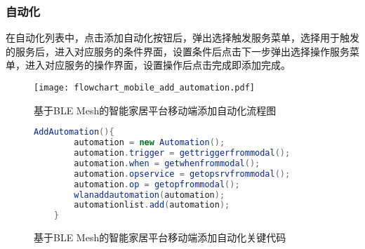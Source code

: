 \subsubsection{自动化}
在自动化列表中，点击添加自动化按钮后，弹出选择触发服务菜单，选择用于触发的服务后，进入对应服务的条件界面，设置条件后点击下一步弹出选择操作服务菜单，进入对应服务的操作界面，设置操作后点击完成即添加完成。

\begin{figure}[H]
    \centering
    \texttt{[image: flowchart\_mobile\_add\_automation.pdf]}
    \caption{基于BLE Mesh的智能家居平台移动端添加自动化流程图}
    \label{fig:flowchart_mobile_add_automation}
\end{figure}

\begin{figure}[H]
    \centering
    \begin{lstlisting}[language=Java]
    AddAutomation(){
        automation = new Automation();
        automation.trigger = gettriggerfrommodal();
        automation.when = getwhenfrommodal();
        automation.opservice = getopsrvfrommodal();
        automation.op = getopfrommodal();
        wlanaddautomation(automation);
        automationlist.add(automation);
    }
    \end{lstlisting}
    \caption{基于BLE Mesh的智能家居平台移动端添加自动化关键代码}
    \label{fig:code_mobile_add_automation}
\end{figure}